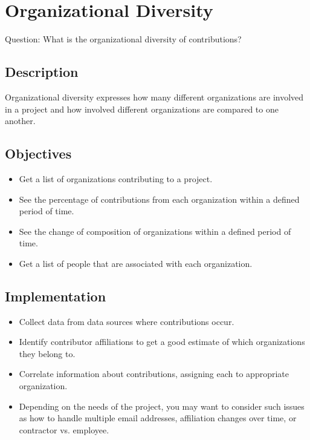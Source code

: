 \hypertarget{organizational-diversity}{%
\section{Organizational Diversity}\label{organizational-diversity}}

Question: What is the organizational diversity of contributions?

\hypertarget{description}{%
\subsection{Description}\label{description}}

Organizational diversity expresses how many different organizations are
involved in a project and how involved different organizations are
compared to one another.

\hypertarget{objectives}{%
\subsection{Objectives}\label{objectives}}

\begin{itemize}
\tightlist
\item
  Get a list of organizations contributing to a project.
\item
  See the percentage of contributions from each organization within a
  defined period of time.
\item
  See the change of composition of organizations within a defined period
  of time.
\item
  Get a list of people that are associated with each organization.
\end{itemize}

\hypertarget{implementation}{%
\subsection{Implementation}\label{implementation}}

\begin{itemize}
\tightlist
\item
  Collect data from data sources where contributions occur.
\item
  Identify contributor affiliations to get a good estimate of which
  organizations they belong to.
\item
  Correlate information about contributions, assigning each to
  appropriate organization.
\item
  Depending on the needs of the project, you may want to consider such
  issues as how to handle multiple email addresses, affiliation changes
  over time, or contractor vs. employee.
\end{itemize}

